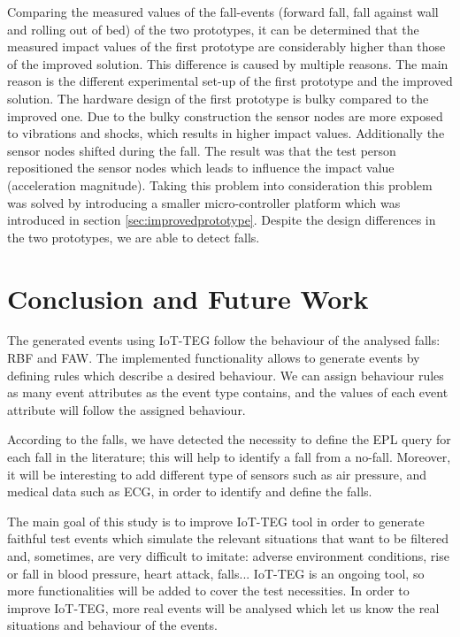 \documentclass[conference]{IEEEtran}
\theoremstyle{definition}
\begin{document}
Comparing the measured values of the fall-events (forward fall, fall against wall and rolling out of bed) of the two 
prototypes, it can be determined that the measured impact values of the first prototype are considerably higher than 
those of the improved solution. This difference is caused by multiple reasons. The main reason is the different 
experimental set-up of the first prototype and the improved solution. The hardware design of the first prototype is 
bulky compared to the improved one. Due to the bulky construction the sensor nodes are more exposed to vibrations and 
shocks, which results in higher impact values. Additionally the sensor nodes shifted during the fall. The result was 
that the test person repositioned the sensor nodes which leads to influence the impact value (acceleration magnitude). 
Taking this problem into consideration this problem was solved by introducing a smaller micro-controller platform 
which was introduced in  section \ref{sec:improvedprototype}. Despite the design differences in the two prototypes, 
we are able to detect falls.

\section{Conclusion and Future Work}
\label{sec:conclusions}

The generated events using IoT-TEG follow the behaviour of the analysed falls: RBF and FAW. The implemented functionality 
allows to generate events by defining rules which describe a desired behaviour. We can assign behaviour rules as many 
event attributes as the event type contains, and the values of each event attribute will follow the assigned behaviour.

According to the falls, we have detected the necessity to define the EPL query for each fall in the literature; this will
help to identify a fall from a no-fall. Moreover, it will be interesting to add different type of sensors such as air
pressure, and medical data such as ECG, in order to identify and define the falls.

The main goal of this study is to improve IoT-TEG tool in order to generate faithful test events which simulate the 
relevant situations that want to be filtered and, sometimes, are very difficult to imitate: adverse environment conditions, 
rise or fall in blood pressure, heart attack, falls... IoT-TEG is an ongoing tool, so more functionalities will be added
to cover the test necessities. In order to improve IoT-TEG, more real events will be analysed which let us know 
the real situations and behaviour of the events.
\end{document}
